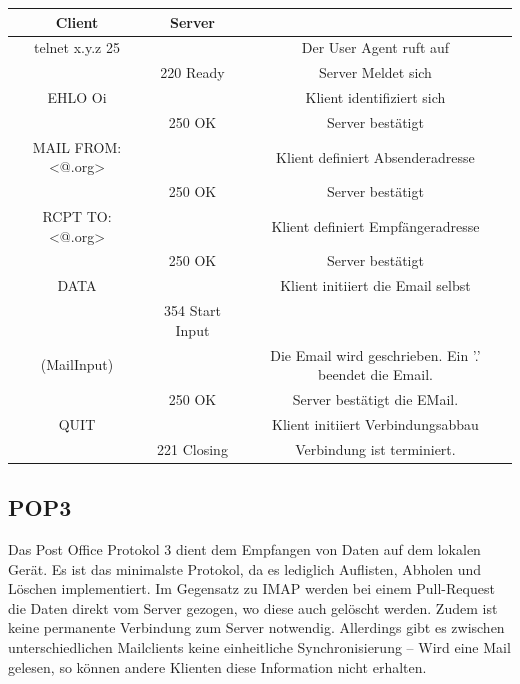 \documentclass{scrartcl}
\begin{document}
    \begin{center}
        \begin{tabular}{c|c|c}
            Client              &   Server          &                                   \\\hline
            telnet x.y.z 25     &                   & Der User Agent ruft auf           \\
                                &   220 Ready       & Server Meldet sich                \\
            EHLO Oi             &                   & Klient identifiziert sich         \\
                                &   250 OK          & Server bestätigt                  \\
            MAIL FROM: <@.org>  &                   & Klient definiert Absenderadresse  \\
                                &   250 OK          & Server bestätigt                  \\
            RCPT TO: <@.org>    &                   & Klient definiert Empfängeradresse \\  
                                &   250 OK          & Server bestätigt                  \\
            DATA                &                   & Klient initiiert die Email selbst \\
                            &   354 Start Input &                                   \\
            (MailInput)         &                   & Die Email wird geschrieben. Ein '.' beendet die Email.  \\
                                &   250 OK          & Server bestätigt die EMail.       \\ 
            QUIT                &                   & Klient initiiert Verbindungsabbau \\
                                &   221 Closing     & Verbindung ist terminiert.    \\
        \end{tabular}
    \end{center}
    
    \subsection{POP3}
    Das Post Office Protokol 3 dient dem Empfangen von Daten auf dem lokalen Gerät.
    Es ist das minimalste Protokol, da es lediglich Auflisten, Abholen und Löschen implementiert. 
    Im Gegensatz zu IMAP werden bei einem Pull-Request die Daten direkt vom Server gezogen, wo diese auch gelöscht werden. Zudem ist keine permanente Verbindung zum Server notwendig. Allerdings gibt es zwischen unterschiedlichen Mailclients keine einheitliche Synchronisierung -- Wird eine Mail gelesen, so können andere Klienten diese Information nicht erhalten.
\end{document}
